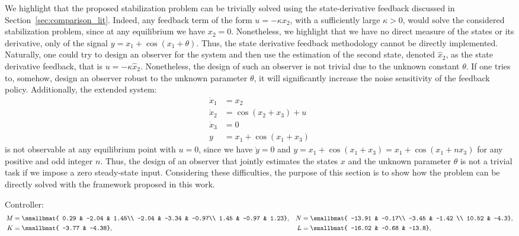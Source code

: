 \documentclass{ifacconf}
\begin{document}
We highlight that the proposed stabilization problem can be trivially solved using the state-derivative feedback discussed in Section~\ref{sec:comparison_lit}. Indeed, any feedback term of the form $u = -\kappa x_2$, with a sufficiently large $\kappa>0$, would solve the considered stabilization problem, since at any equilibrium we have $x_2 = 0$. Nonetheless, we highlight that we have no direct measure of the states or its derivative, only of the signal $y = x_1 + \cos(x_1+\theta)$. Thus, the state derivative feedback methodology cannot be directly implemented. Naturally, one could try to design an observer for the system and then use the estimation of the second state, denoted $\hat x_2$, as the state derivative feedback, that is  $u = -\kappa \hat x_2$. Nonetheless, the design of such an observer is not trivial due to the unknown constant $\theta$. If one tries to, somehow, design an observer robust to the unknown parameter $\theta$, it will significantly increase the noise sensitivity of the feedback policy. Additionally, the extended system:
$$
\begin{aligned}
    \dot x_1 &= x_2 \\
    \dot x_2 &= \cos(x_2+x_3) + u \\
    \dot x_3 &= 0 \\
    y &= x_1 + \cos(x_1+x_3)
\end{aligned}
$$
is not observable at any equilibrium point with $u=0$, since we have $\dot y = 0$ and $y = x_1 + \cos(x_1+x_3) = x_1 + \cos(x_1+n x_3)$ for any positive and odd integer $n$. Thus, the design of an observer that jointly estimates the states $x$ and the unknown parameter $\theta$ is not a trivial task if we impose a zero steady-state input. Considering these difficulties, the purpose of this section is to show how the problem can be directly solved with the framework proposed in this work.

Controller:
\begin{equation*}
\begin{aligned}
    M &= \smallbmat{
        0.29 &  -2.04  &  1.45\\
   -2.04 &  -3.34 &  -0.97\\
    1.45 &  -0.97  &  1.23},  &N &= \smallbmat{
        -13.91  & -0.17\\
   -3.45  & -1.42 \\
   10.52 &  -4.3}, \\
    K &= \smallbmat{
        -3.77 &  -4.38},  
    &L &= \smallbmat{
        -16.02 &  -0.68 & -13.8},
\end{aligned}
\end{equation*}
\end{document}
